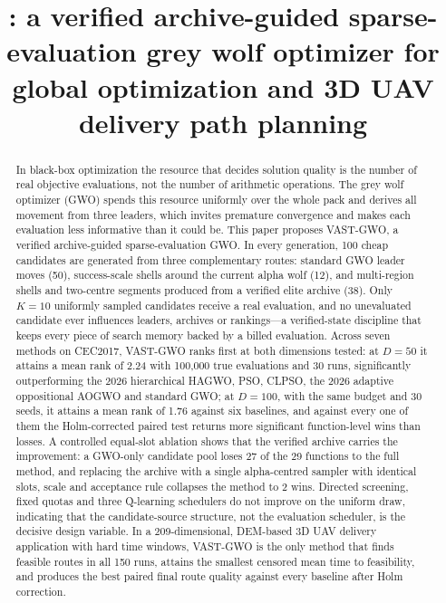\documentclass[11pt,a4paper]{article}
\title{\bfseries \method{}: a verified archive-guided sparse-evaluation grey wolf
optimizer for global optimization and 3D UAV delivery path planning}
\author{}
\date{}
\newcommand{\method}{VAST-GWO}
\begin{document}
\maketitle
\vspace{-1.6cm}

\begin{abstract}
\noindent
In black-box optimization the resource that decides solution quality is the
number of real objective evaluations, not the number of arithmetic operations.
The grey wolf optimizer (GWO) spends this resource uniformly over the whole
pack and derives all movement from three leaders, which invites premature
convergence and makes each evaluation less informative than it could be. This
paper proposes \method{}, a verified archive-guided sparse-evaluation GWO. In
every generation, 100 cheap candidates are generated from three complementary
routes: standard GWO leader moves (50), success-scale shells around the current
alpha wolf (12), and multi-region shells and two-centre segments produced from
a verified elite archive (38). Only $K=10$ uniformly sampled candidates receive
a real evaluation, and no unevaluated candidate ever influences leaders,
archives or rankings---a verified-state discipline that keeps every piece of
search memory backed by a billed evaluation. Across seven methods on CEC2017,
\method{} ranks first at both dimensions tested: at $D=50$ it attains a mean
rank of 2.24 with 100{,}000 true evaluations and 30 runs, significantly
outperforming the 2026 hierarchical HAGWO, PSO, CLPSO, the 2026 adaptive
oppositional AOGWO and standard GWO; at $D=100$, with the same budget and 30
seeds, it attains a mean rank of 1.76 against six baselines, and against every
one of them the Holm-corrected paired test returns more significant
function-level wins than losses. A controlled
equal-slot ablation shows that the verified archive carries the improvement: a
GWO-only candidate pool loses 27 of the 29 functions to the full method, and
replacing the archive with a single alpha-centred sampler with identical slots,
scale and acceptance rule collapses the method to 2 wins. Directed screening,
fixed quotas and three Q-learning schedulers do not improve on the uniform
draw, indicating that the candidate-source structure, not the evaluation
scheduler, is the decisive design variable. In a 209-dimensional, DEM-based 3D
UAV delivery application with hard time windows, \method{} is the only method
that finds feasible routes in all 150 runs, attains the smallest censored mean
time to feasibility, and produces the best paired final route quality against
every baseline after Holm correction.
\end{abstract}
\end{document}
